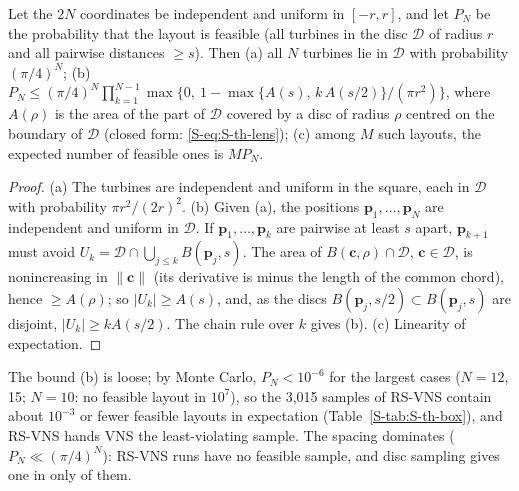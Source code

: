 \begin{proposition}\label{prop:S-box}
Let the $2N$ coordinates be independent and uniform in $[-r,r]$, and let $P_N$ be the probability that the layout is feasible (all turbines in the disc $\mathcal D$ of radius $r$ and all pairwise distances $\ge s$). Then (a) all $N$ turbines lie in $\mathcal D$ with probability $(\pi/4)^N$; (b) $P_N\le(\pi/4)^N\prod_{k=1}^{N-1}\max\bigl\{0,\ 1-\max\{A(s),\,k\,A(s/2)\}/(\pi r^2)\bigr\}$, where $A(\rho)$ is the area of the part of $\mathcal D$ covered by a disc of radius $\rho$ centred on the boundary of $\mathcal D$ (closed form: \eqref{S-eq:S-th-lens}); (c) among $M$ such layouts, the expected number of feasible ones is $MP_N$.
\end{proposition}
\begin{proof}
(a) The turbines are independent and uniform in the square, each in $\mathcal D$ with probability $\pi r^2/(2r)^2$. (b) Given (a), the positions $\mathbf p_1,\ldots,\mathbf p_N$ are independent and uniform in $\mathcal D$. If $\mathbf p_1,\ldots,\mathbf p_k$ are pairwise at least $s$ apart, $\mathbf p_{k+1}$ must avoid $U_k=\mathcal D\cap\bigcup_{j\le k}B(\mathbf p_j,s)$. The area of $B(\mathbf c,\rho)\cap \mathcal D$, $\mathbf c\in \mathcal D$, is nonincreasing in $\lVert\mathbf c\rVert$ (its derivative is minus the length of the common chord), hence $\ge A(\rho)$; so $\lvert U_k\rvert\ge A(s)$, and, as the discs $B(\mathbf p_j,s/2)\subset B(\mathbf p_j,s)$ are disjoint, $\lvert U_k\rvert\ge kA(s/2)$. The chain rule over $k$ gives (b). (c) Linearity of expectation.
\end{proof}
The bound (b) is loose; by Monte Carlo, $P_N<10^{-6}$ for the largest cases ($N=12$, 15; $N=10$: no feasible layout in $10^7$), so the 3,015 samples of RS-VNS contain about $10^{-3}$ or fewer feasible layouts in expectation (Table~\ref{S-tab:S-th-box}), and RS-VNS hands VNS the least-violating sample. The spacing dominates ($P_N\ll(\pi/4)^N$): \NRSRunsNoFeasSample{} RS-VNS runs have no feasible sample, and disc sampling gives one in only \NRsSquareExplains{} of them.

